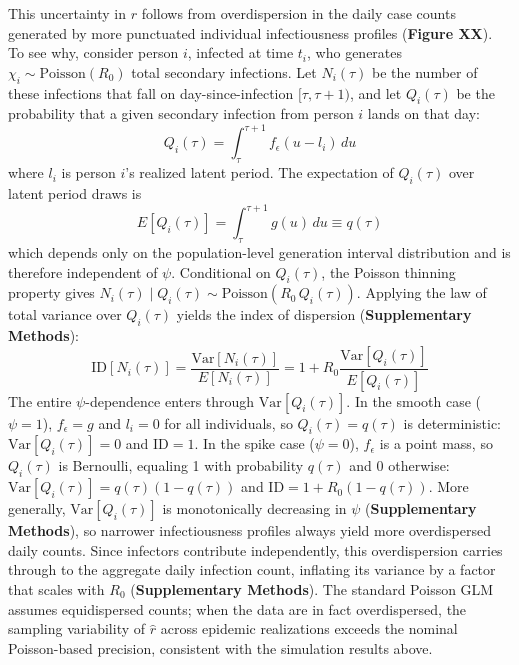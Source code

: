 This uncertainty in $r$ follows from overdispersion in the daily case counts generated by more punctuated individual infectiousness profiles ({\bf Figure XX}). To see why, consider person $i$, infected at time $t_i$, who generates $\chi_i \sim \text{Poisson}(R_0)$ total secondary infections. Let $N_i(\tau)$ be the number of these infections that fall on day-since-infection $[\tau, \tau+1)$, and let $Q_i(\tau)$ be the probability that a given secondary infection from person $i$ lands on that day:
\begin{equation}
	Q_i(\tau) = \int_\tau^{\tau+1} f_\epsilon(u - l_i) \, du
\end{equation}
where $l_i$ is person $i$'s realized latent period. The expectation of $Q_i(\tau)$ over latent period draws is
\begin{equation}
	E[Q_i(\tau)] = \int_\tau^{\tau+1} g(u) \, du  \equiv q(\tau)
\end{equation}
which depends only on the population-level generation interval distribution and is therefore independent of $\psi$. Conditional on $Q_i(\tau)$, the Poisson thinning property gives $N_i(\tau) \mid Q_i(\tau) \sim \text{Poisson}(R_0 \, Q_i(\tau))$. Applying the law of total variance over $Q_i(\tau)$ yields the index of dispersion ({\bf Supplementary Methods}):
\begin{equation}
\text{ID}[N_i(\tau)] = \frac{\text{Var}[N_i(\tau)]}{E[N_i(\tau)]} = 1 + R_0 \frac{\text{Var}[Q_i(\tau)]}{E[Q_i(\tau)]}
\end{equation}
The entire $\psi$-dependence enters through $\text{Var}[Q_i(\tau)]$. In the smooth case ($\psi = 1$), $f_\epsilon = g$ and $l_i = 0$ for all individuals, so $Q_i(\tau) = q(\tau)$ is deterministic: $\text{Var}[Q_i(\tau)] = 0$ and $\text{ID} = 1$. In the spike case ($\psi = 0$), $f_\epsilon$ is a point mass, so $Q_i(\tau)$ is Bernoulli, equaling 1 with probability $q(\tau)$ and 0 otherwise: $\text{Var}[Q_i(\tau)] = q(\tau)(1 - q(\tau))$ and $\text{ID} = 1 + R_0(1 - q(\tau))$. More generally, $\text{Var}[Q_i(\tau)]$ is monotonically decreasing in $\psi$ ({\bf Supplementary Methods}), so narrower infectiousness profiles always yield more overdispersed daily counts. Since infectors contribute independently, this overdispersion carries through to the aggregate daily infection count, inflating its variance by a factor that scales with $R_0$ ({\bf Supplementary Methods}). The standard Poisson GLM assumes equidispersed counts; when the data are in fact overdispersed, the sampling variability of $\hat{r}$ across epidemic realizations exceeds the nominal Poisson-based precision, consistent with the simulation results above.

